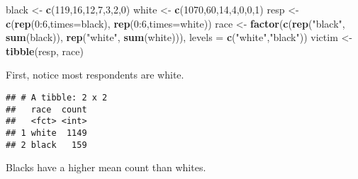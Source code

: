 \documentclass[]{article}
\newenvironment{Shaded}{\begin{snugshade}}{\end{snugshade}}
\newcommand{\KeywordTok}[1]{\textcolor[rgb]{0.13,0.29,0.53}{\textbf{{#1}}}}
\newcommand{\DataTypeTok}[1]{\textcolor[rgb]{0.13,0.29,0.53}{{#1}}}
\newcommand{\DecValTok}[1]{\textcolor[rgb]{0.00,0.00,0.81}{{#1}}}
\newcommand{\StringTok}[1]{\textcolor[rgb]{0.31,0.60,0.02}{{#1}}}
\newcommand{\NormalTok}[1]{{#1}}
\begin{document}
\begin{Shaded}
\begin{Highlighting}[]
\NormalTok{black <-}\StringTok{ }\KeywordTok{c}\NormalTok{(}\DecValTok{119}\NormalTok{,}\DecValTok{16}\NormalTok{,}\DecValTok{12}\NormalTok{,}\DecValTok{7}\NormalTok{,}\DecValTok{3}\NormalTok{,}\DecValTok{2}\NormalTok{,}\DecValTok{0}\NormalTok{)}
\NormalTok{white <-}\StringTok{ }\KeywordTok{c}\NormalTok{(}\DecValTok{1070}\NormalTok{,}\DecValTok{60}\NormalTok{,}\DecValTok{14}\NormalTok{,}\DecValTok{4}\NormalTok{,}\DecValTok{0}\NormalTok{,}\DecValTok{0}\NormalTok{,}\DecValTok{1}\NormalTok{)}
\NormalTok{resp <-}\StringTok{ }\KeywordTok{c}\NormalTok{(}\KeywordTok{rep}\NormalTok{(}\DecValTok{0}\NormalTok{:}\DecValTok{6}\NormalTok{,}\DataTypeTok{times=}\NormalTok{black), }\KeywordTok{rep}\NormalTok{(}\DecValTok{0}\NormalTok{:}\DecValTok{6}\NormalTok{,}\DataTypeTok{times=}\NormalTok{white))}
\NormalTok{race <-}\StringTok{ }\KeywordTok{factor}\NormalTok{(}\KeywordTok{c}\NormalTok{(}\KeywordTok{rep}\NormalTok{(}\StringTok{"black"}\NormalTok{, }\KeywordTok{sum}\NormalTok{(black)), }\KeywordTok{rep}\NormalTok{(}\StringTok{"white"}\NormalTok{, }\KeywordTok{sum}\NormalTok{(white))), }\DataTypeTok{levels =} \KeywordTok{c}\NormalTok{(}\StringTok{"white"}\NormalTok{,}\StringTok{"black"}\NormalTok{))}
\NormalTok{victim <-}\StringTok{ }\KeywordTok{tibble}\NormalTok{(resp, race)}
\end{Highlighting}
\end{Shaded}

First, notice most respondents are white.

\begin{Shaded}
\end{Shaded}

\begin{verbatim}
## # A tibble: 2 x 2
##   race  count
##   <fct> <int>
## 1 white  1149
## 2 black   159
\end{verbatim}

Blacks have a higher mean count than whites.

\begin{Shaded}
\end{Shaded}
\end{document}
